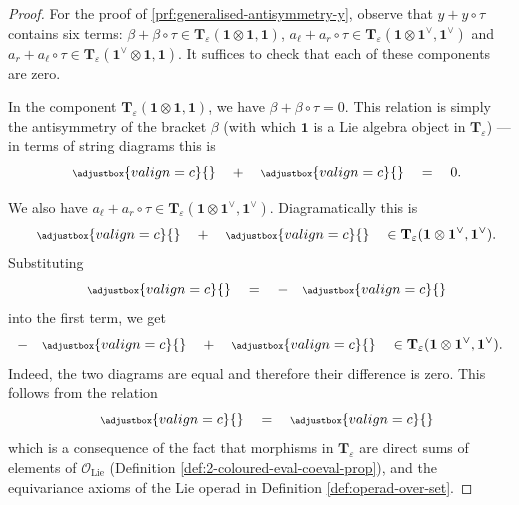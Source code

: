 \begin{proof}
	For the proof of \ref{prf:generalised-antisymmetry-y}, observe that \(y + y \circ \tau\) contains six terms:
	\(\beta + \beta \circ \tau \in \mathbf{T}_{\varepsilon}(\mathbf{1} \otimes \mathbf{1}, \mathbf{1})\),
	\(a_{\ell} + a_{r} \circ \tau \in \mathbf{T}_{\varepsilon}(\mathbf{1} \otimes \mathbf{1}^{\vee}, \mathbf{1}^{\vee})\) and
	\(a_{r} + a_{\ell} \circ \tau \in \mathbf{T}_{\varepsilon}(\mathbf{1}^{\vee} \otimes \mathbf{1}, \mathbf{1})\).
	It suffices to check that each of these components are zero.

	In the component \(\mathbf{T}_{\varepsilon}(\mathbf{1} \otimes \mathbf{1}, \mathbf{1})\), we have \(\beta + \beta \circ \tau = 0\). This relation is simply the antisymmetry of the bracket \(\beta\) (with which \(\mathbf{1}\) is a Lie algebra object in \(\mathbf{T}_{\varepsilon}\)) --- in terms of string diagrams this is
	\[
		\quad
		{\scriptsize
		\def\svgscale{0.38}
		\adjustbox{valign=c}{}
		}
		\quad
		+
		\quad
		{\scriptsize
		\def\svgscale{0.38}
		\adjustbox{valign=c}{}
		}
		\quad
		=
		\quad
		0
		.
	\]

	We also have \(a_{\ell} + a_{r} \circ \tau \in \mathbf{T}_{\varepsilon}(\mathbf{1} \otimes \mathbf{1}^{\vee}, \mathbf{1}^{\vee})\). Diagramatically this is
	\[
		\quad
		{\scriptsize
		\def\svgscale{0.38}
		\adjustbox{valign=c}{}
		}
		\quad
		+
		\quad
		{\scriptsize
		\def\svgscale{0.38}
		\adjustbox{valign=c}{}
		}
		\quad
		\in \mathbf{T}_{\varepsilon}(\mathbf{1} \otimes \mathbf{1}^{\vee}, \mathbf{1}^{\vee})
		.
	\]
	Substituting
	\[
		\quad
		{\scriptsize
		\def\svgscale{0.38}
		\adjustbox{valign=c}{}
		}
		\quad
		=
		\quad
		-
		\quad
		{\scriptsize
		\def\svgscale{0.38}
		\adjustbox{valign=c}{}
		}
	\]
	into the first term, we get
	\[
		-
		\quad
		{\scriptsize
		\def\svgscale{0.38}
		\adjustbox{valign=c}{}
		}
		\quad
		+
		\quad
		{\scriptsize
		\def\svgscale{0.38}
		\adjustbox{valign=c}{}
		}
		\quad
		\in \mathbf{T}_{\varepsilon}(\mathbf{1} \otimes \mathbf{1}^{\vee}, \mathbf{1}^{\vee})
		.
	\]
	Indeed, the two diagrams are equal and therefore their difference is zero. This follows from the relation
	\[
		\quad
		{\scriptsize
		\def\svgscale{0.38}
		\adjustbox{valign=c}{}
		}
		\quad
		=
		\quad
		{\scriptsize
		\def\svgscale{0.38}
		\adjustbox{valign=c}{}
		}
	\]
	which is a consequence of the fact that morphisms in \(\mathbf{T}_{\varepsilon}\) are direct sums of elements of \(\mathcal{O}_{\text{Lie}}\) (Definition \ref{def:2-coloured-eval-coeval-prop}), and the equivariance axioms of the Lie operad in Definition \ref{def:operad-over-set}.


\end{proof}
